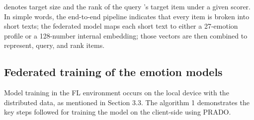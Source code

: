 denotes target size and  the rank of the query ’s target item under a given scorer.
In simple words, the end-to-end pipeline indicates that every item is broken into short texts; the federated model maps each short text to either a 27-emotion profile or a 128-number internal embedding; those vectors are then combined to represent, query, and rank items.

\subsection{Federated training of the emotion models}
Model training in the FL environment occurs on the local device with the distributed data, as mentioned in Section 3.3. The algorithm 1 demonstrates the key steps followed for training the model on the client-side using PRADO.

